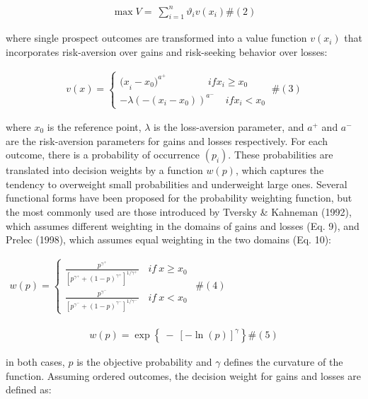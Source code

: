 \documentclass[
]{article}
\begin{document}
\[\begin{array}{r}
\max{V = \ }\sum_{i = 1}^{n}{\vartheta_{i}v\left( x_{i} \right)}\#(2)
\end{array}\]

where single prospect outcomes are transformed into a value function
\(v\left( x_{i} \right)\) that incorporates risk-aversion over gains and
risk-seeking behavior over losses:

\[\begin{array}{r}
v(x) = \left\{ \begin{array}{r}
{{(x}_{i} - x_{0})}^{a^{+}}\ \ \ \ \ \ \ \ \ \ \ \ \ \ \ \ \ \ \ ifx_{i} \geq x_{0} \\
 - \lambda\left( - \left( x_{i} - x_{0} \right) \right)^{a^{-}}\ \ \ \ \ ifx_{i} < x_{0}
\end{array} \right.\ \#(3)
\end{array}\]

where \(x_{0}\) is the reference point, \(\lambda\) is the loss-aversion
parameter, and \(a^{+}\) and \(a^{-}\) are the risk-aversion parameters
for gains and losses respectively. For each outcome, there is a
probability of occurrence \(\left( p_{i} \right)\). These probabilities
are translated into decision weights by a function \(w(p)\), which
captures the tendency to overweight small probabilities and underweight
large ones. Several functional forms have been proposed for the
probability weighting function, but the most commonly used are those
introduced by Tversky \& Kahneman (1992), which assumes different
weighting in the domains of gains and losses (Eq. 9), and Prelec (1998),
which assumes equal weighting in the two domains (Eq. 10):

\(\begin{array}{r}
w(p) = \left\{ \begin{array}{r}
\frac{p^{\gamma^{+}}}{\left\lbrack p^{\gamma^{+}} + (1 - p)^{\gamma^{+}} \right\rbrack^{1\text{/}\gamma^{+}\ }}\ \ \ \ if\ x \geq x_{0}\  \\
\frac{p^{\gamma^{-}}}{\left\lbrack p^{\gamma^{-}} + (1 - p)^{\gamma^{-}} \right\rbrack^{1\text{/}\gamma^{-}\ }}\ \ \ \ if\ x < x_{0}
\end{array} \right.\ \#(4)
\end{array}\)

\[\begin{array}{r}
w(p) = \exp\left\{ \  - \ \left\lbrack - \ln(p) \right\rbrack^{\gamma} \right\}\#(5)
\end{array}\]

in both cases, \(p\) is the objective probability and \(\gamma\) defines
the curvature of the function. Assuming ordered outcomes, the decision
weight for gains and losses are defined as:
\end{document}
